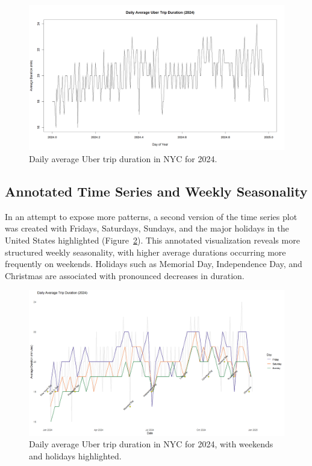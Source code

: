 \documentclass{article}
\begin{document}
\begin{figure}
  \includegraphics[width=\textwidth]{avg_trip_duration_simple.png}
  \caption{Daily average Uber trip duration in NYC for 2024.}
  \label{fig:initial_plot}
\end{figure}

\subsection{Annotated Time Series and Weekly Seasonality}
In an attempt to expose more patterns, a second version of the time series plot was created with Fridays, Saturdays, Sundays, and the major holidays in the United States highlighted (Figure~\ref{fig:timeseries_plot}). This annotated visualization reveals more structured weekly seasonality, with higher average durations occurring more frequently on weekends. Holidays such as Memorial Day, Independence Day, and Christmas are associated with pronounced decreases in duration.

\begin{figure}
  \includegraphics[width=\textwidth]{avg_trip_duration_by_day.png}
  \caption{Daily average Uber trip duration in NYC for 2024, with weekends and holidays highlighted.}
  \label{fig:timeseries_plot}
\end{figure}
\end{document}
